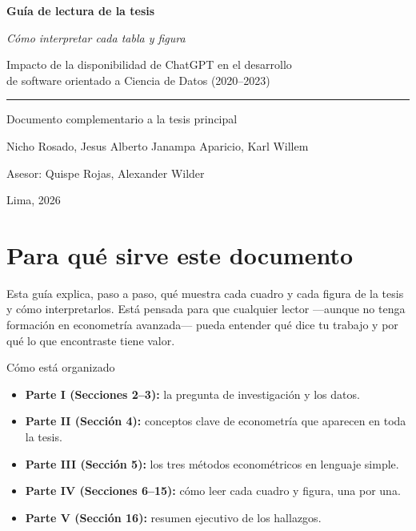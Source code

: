 \documentclass[11pt,a4paper]{article}
\begin{document}
\begin{titlepage}
\centering
\vspace*{3\baselineskip}
{\Huge\bfseries Guía de lectura de la tesis}\par
\vspace{0.5\baselineskip}
{\Large \textit{Cómo interpretar cada tabla y figura}}\par
\vspace{2\baselineskip}
{\large Impacto de la disponibilidad de ChatGPT en el desarrollo \\
de software orientado a Ciencia de Datos (2020--2023)}\par
\vspace{3\baselineskip}
\rule{0.6\textwidth}{0.5pt}\par
\vspace{2\baselineskip}
{\normalsize Documento complementario a la tesis principal}\par
\vspace{0.5\baselineskip}
{\normalsize Nicho Rosado, Jesus Alberto \quad \textbar \quad Janampa Aparicio, Karl Willem}\par
\vspace{0.5\baselineskip}
{\normalsize Asesor: Quispe Rojas, Alexander Wilder}\par
\vspace{4\baselineskip}
{\small Lima, 2026}\par
\vfill
\end{titlepage}

\tableofcontents
\clearpage

\section{Para qué sirve este documento}

Esta guía explica, paso a paso, qué muestra cada cuadro y cada figura de la tesis y cómo interpretarlos. Está pensada para que cualquier lector —aunque no tenga formación en econometría avanzada— pueda entender qué dice tu trabajo y por qué lo que encontraste tiene valor.

\begin{ideabox}{Cómo está organizado}
\begin{itemize}[leftmargin=*]
  \item \textbf{Parte I (Secciones 2--3):} la pregunta de investigación y los datos.
  \item \textbf{Parte II (Sección 4):} conceptos clave de econometría que aparecen en toda la tesis.
  \item \textbf{Parte III (Sección 5):} los tres métodos econométricos en lenguaje simple.
  \item \textbf{Parte IV (Secciones 6--15):} cómo leer cada cuadro y figura, una por una.
  \item \textbf{Parte V (Sección 16):} resumen ejecutivo de los hallazgos.
\end{itemize}
\end{ideabox}
\end{document}
